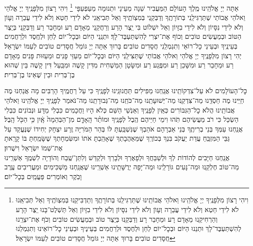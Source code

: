 אַתָּה יְיָ אֱלֹהֵֽינוּ מֶֽלֶךְ הָעוֹלָם הַמַּעֲבִיר שֵׁנָה מֵעֵינָי וּתְנוּמָה מֵעַפְעַפָּי \middot
\footnote{
	וִיהִי רָצוֹן מִלְּפָנֶֽיךָ יְיָ אֱלֹהֵֽינוּ וֵאלֹהֵי אֲבוֹתֵֽינוּ שֶׁתַּרְגִּילֵֽנוּ בְּתוֹרָתֶֽךָ וְתַדְבִּיקֵֽנוּ בְּמִצְוׂתֶֽיךָ וְאַל תְּבִיאֵֽנוּ לֹא לִידֵי חֵטְא וְלֹא לִידֵי עֲבֵרָה וְעָוׂן וְלֹא לִידֵי נִסָּיוֹן וְלֹא לִידֵי בִזָּיוֹן וְאַל תַּשְׁלֶט־בָּנוּ יֵֽצֶר הָרָע וְהַרְחִיקֵֽנוּ מֵאָדָם רָע וּמֵחָבֵר רָע וְדַבְּקֵֽנוּ בְּיֵֽצֶר טוֹב וּבְמַעֲשִׂים טוֹבִים וְכֹף אֶת־יִצְרֵֽנוּ לְהִשְׁתַּעְבֶּד־לָךְ \middot וּתְנֵנוּ הַיּוֹם וּבְכׇל־יוֹם לְחֵן וּלְחֶסֶד וּלְרַחֲמִים בְּעֵינֶיךָ וּבְעֵינֵי כׇל־רוֹאֵינוּ וְתִגְמְלֵנוּ חֲסָדִים טוֹבִים׃ בָּרוּךְ אַתָּה יְיָ גּוֹמֵל חֲסָדִים טוֹבִים לְעַמּוֹ יִשְׂרָאֵל׃
	} 
וִיהִי רָצוֹן מִלְּפָנֶֽיךָ יְיָ אֱלֹהַי וֵאלֹהֵי אֲבוֹתַי שֶׁתַּרְגִּילֵֽנִי בְּתוֹרָתֶֽךָ וְדַבְּקֵֽנִי בְּמִצְוֹתֶֽיךָ וְאַל תְּבִיאֵֽנִי לֹא לִידֵי חֵטְא וְלֹא לִידֵי עֲבֵרָה וְעָוֹן וְלֹא לִידֵי נִסָּיוֹן וְלֹא לִידֵי בִזָּיוֹן וְאַל יִשְׁלוֹט בִּי יֵֽצֶר הָרַע וְרַחֲקֵֽנִי מֵאָדָם רַע וּמֵחָבֵר רַע וְדַבְּקֵֽנִי בְּיֵֽצֶר הַטּוֹב וּבְמַעֲשִׂים טוֹבִים וְכוֹף אֶת־יִצְרִי לְהִשְׁתַּעְבֶּד־לָךְ׃ וּתְנֵֽנִי הַיּוֹם וּבְכָל־יוֹם לְחֵן וּלְחֶֽסֶד וּלְרַחֲמִים בְּעֵינֶֽיךָ וּבְעֵינֵי כָל־רוֹאַי וְתִגְמְלֵֽנִי חֲסָדִים טוֹבִים׃ בָּרוּךְ אַתָּה יְיָ גּוֹמֵל חֲסָדִים טוֹבִים לְעַמּוֹ יִשְׂרָאֵל׃\\
%
יְהִי רָצוֹן מִלְּפָנֶֽיךָ יְיָ אֱלֹהַי וֵאלֹהֵי אֲבוֹתַי שֶׁתַּצִּילֵֽנִי הַיּוֹם וּבְכׇל־יוֹם מֵעַזֵּי פָנִים וּמֵעַזּוּת פָּנִים מֵאָדָם רַע וּמֵחָבֵר רַע וּמִשָּׁכֵן רַע וּמִפֶּֽגַע רַע וּמִשָּׂטָן הַמַּשְׁחִית מִדִּין קָשֶׁה וּמִבַּֽעַל דִּין קָשֶׁה בֵּין שְׁהוּא בֶן־בְּרִית וּבֵין שֶׁאֵינוֹ בֶן־בְּרִית׃


כׇּל־הָעוֹלָמִים לֹא עַל־צִדְקוֹתֵֽינוּ אֲנַֽחְנוּ מַפִּילִים תַּחֲנוּנֵֽינוּ לְפָנֶֽיךָ כִּי עַל רַחֲמֶֽיךָ הָרַבִּים \middot מָה אֲנַחְנוּ מֶה חַיֵּֽינוּ מֶה חַסְדֵּֽנוּ מַה־צִּדְקֵֽנוּ מַה־יְּשׁוּעָתֵֽנוּ מַה־כֹּחֵֽנוּ מַה־גְּבוּרָתֵֽנוּ \middot מַה־נֹּאמַר לְפָנֶֽיךָ יְיָ אֱלֹהֵֽינוּ וֵאלֹהֵי אֲבוֹתֵֽינוּ הֲלֹא כׇל־הַגִּבּוֹרִים כְּאַֽיִן לְפָנֶֽיךָ וְאַנְשֵׁי הַשֵּׁם כְּלֹא הָיוּ וַחֲכָמִים כִּבְלִי מַדָּע וּנְבוֹנִים כִּבְלִי הַשְׂכֵּל \middot כִּי רֹב מַעֲשֵׂיהֶם תֹּֽהוּ וִימֵי חַיֵּיהֶם הֶֽבֶל לְפָנֶֽיךָ
וּמוֹתַ֨ר הָֽאָדָ֤ם מִן־הַבְּהֵמָה֙ אָֽ֔יִן כִּ֥י הַכֹּ֖ל הָֽבֶל׃ \\
אֲנַֽחְנוּ עַמְּךָ בְּנֵי בְרִיתֶֽךָ בְּנֵי אַבְרָהָם אֹהַבְךָ שֶׁנִּשְׁבַּֽעְתָּ לּוֹ בְּהַר הַמֹּרִיָּה זֶֽרַע יִצְחָק יְחִידוֹ שֶׁנֶּעֱקַד עַל גַּבֵּי הַמִּזְבֵּֽחַ עֲדַת יַעֲקֹב בִּנְךָ בְּכוֹרֶֽךָ שֶׁמֵּאַהֲבָתְךָ שֶׁאָהַֽבְתָּ אֹתוֹ וּמִשִּׂמְחָתְךָ שֶׁשָּׂמַֽחְתָּ בּוֹ קָרָֽאתָ אֶת־שְׁמוֹ יִשְׂרָאֵל וִישֻׁרוּן׃ \\
אֲנַֽחְנוּ חַיָּבִים לְהוֹדוֹת לְךָ וּלְשַׁבֵּחֲךָ וּלְפָאֶרְךָ וּלְבָרֵךְ וּלְקַדֵּשׁ וְלִתֵּן־שֶֽׁבַח וְהוֹדָיָה לִשְׁמֶֽךָ \middot אַשְׁרֵֽינוּ מַה־טּוֹב חֶלְקֵֽנוּ וּמַה־נָּעִים גּוֹרָלֵֽינוּ וּמַה־יָּפָה יְרֻשָּׁתֵֽינוּ \middot אַשְׁרֵֽינוּ שֶׁאֲנַֽחְנוּ מַשְׁכִּימִים וּמַעֲרִיבִים עֶֽרֶב וָבֹֽקֶר וְאוֹמְרִים פַּעֲמַֽיִם בְּכׇל־יוֹם׃

